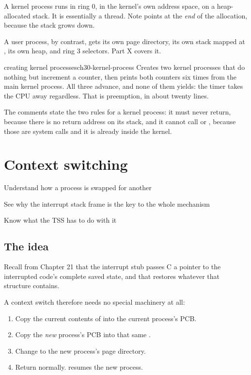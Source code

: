 A kernel process runs in ring 0, in the kernel's own address space, on a heap-allocated stack. It is
essentially a thread. Note  points at the \emph{end} of the allocation, because the stack
grows down.

A user process, by contrast, gets its own page directory, its own stack mapped at
, its own heap, and ring 3 selectors. Part X covers it.

\begin{recipe}{creating kernel processes}{ch30-kernel-process}
Creates two kernel processes that do nothing but increment a counter, then prints both counters six
times from the main kernel process. All three advance, and none of them yields: the timer takes the
CPU away regardless. That is preemption, in about twenty lines.

The comments state the two rules for a kernel process: it must never return, because there is no
return address on its stack, and it cannot call  or , because those are
system calls and it is already inside the kernel.
\end{recipe}

\chapter{Context switching}

\begin{goals}
  \item Understand how a process is swapped for another
  \item See why the interrupt stack frame is the key to the whole mechanism
  \item Know what the TSS has to do with it
\end{goals}

\section{The idea}

Recall from Chapter 21 that the interrupt stub passes C a pointer to the interrupted code's complete
saved state, and that  restores whatever that structure contains.

A context switch therefore needs no special machinery at all:

\begin{enumerate}
  \item Copy the current contents of  into the current process's PCB.
  \item Copy the \emph{new} process's PCB into that same .
  \item Change  to the new process's page directory.
  \item Return normally.  resumes the new process.
\end{enumerate}

